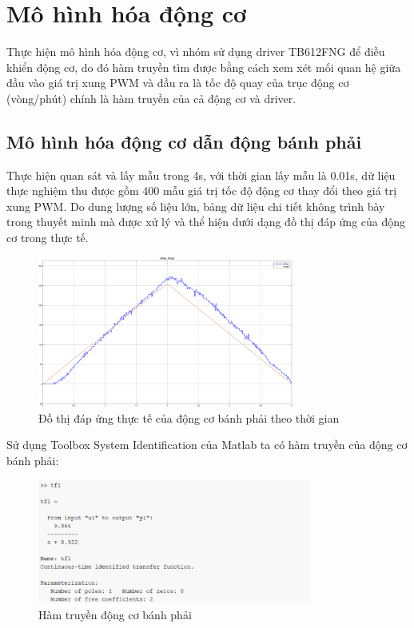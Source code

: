      \section{Mô hình hóa động cơ}
          \hspace*{0.6cm}Thực hiện mô hình hóa động cơ, vì nhóm sử dụng driver TB612FNG để điều khiển động cơ, do đó hàm truyền tìm được bằng cách xem xét mối quan hệ giữa đầu vào giá trị xung PWM và đầu ra là tốc độ quay của trục động cơ (vòng/phút) chính là hàm truyền của cả động cơ và driver.   
          \subsection{Mô hình hóa động cơ dẫn động bánh phải}    
               \hspace*{0.6cm}Thực hiện quan sát và lấy mẫu trong 4s, với thời gian lấy mẫu là 0.01s, dữ liệu thực nghiệm thu được gồm 400 mẫu giá trị tốc độ động cơ thay đổi theo giá trị xung PWM. Do dung lượng số liệu lớn, 
               bảng dữ liệu chi tiết không trình bày trong thuyết minh mà được xử lý và thể hiện dưới dạng đồ thị đáp ứng của động cơ trong thực tế. 
               \begin{figure}[H]
                    \centering
                    \includegraphics[width=0.75\textwidth]{pictures/chapter5/CJGB1_response.png}
                    \caption{Đồ thị đáp ứng thực tế của động cơ bánh phải theo thời gian}
                    \label{CJGB1_response}
               \end{figure}  
               Sử dụng Toolbox System Identification của Matlab ta có hàm truyền của động cơ bánh phải: 
               \begin{figure}[H]
                    \centering
                    \includegraphics[width=0.8\textwidth]{pictures/chapter5/CJGB1_tf.png}
                    \caption{Hàm truyền động cơ bánh phải}
                    \label{CJGB1_tf}
               \end{figure} 
